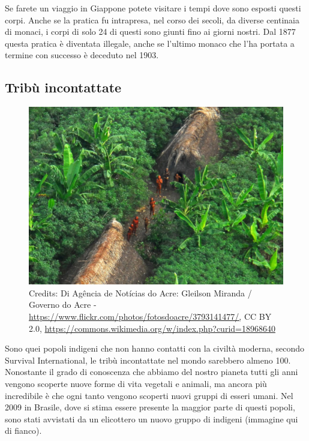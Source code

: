 \documentclass[12pt]{book} %
\begin{document}
Se farete un viaggio in Giappone potete visitare i tempi dove sono esposti questi corpi. Anche se la pratica fu
intrapresa, nel corso dei secoli, da diverse centinaia di monaci, i corpi di solo 24 di questi sono giunti fino ai
giorni nostri. Dal 1877 questa pratica è diventata illegale, anche se l'ultimo monaco che l'ha
portata a termine con successo è deceduto nel 1903.


\bigskip

\subsection{Tribù incontattate}

\begin{figure}
  \centering
  \includegraphics[width=0.95\linewidth]{images/Libro-img043.jpg}
  \begin{minipage}{\linewidth}
    \caption{Credits: Di Agência de Notícias do Acre: Gleilson Miranda / Governo do Acre -
\protect\url{https://www.flickr.com/photos/fotosdoacre/3793141477/,} CC BY 2.0,
\protect\url{https://commons.wikimedia.org/w/index.php?curid=18968640} }
  \end{minipage}
\end{figure}

Sono quei popoli indigeni che non hanno contatti con la civiltà moderna, secondo Survival International, le tribù
incontattate nel mondo sarebbero almeno 100. Nonostante il grado di conoscenza che abbiamo del nostro pianeta tutti gli
anni vengono scoperte nuove forme di vita vegetali e animali, ma ancora più incredibile è che ogni tanto vengono
scoperti nuovi gruppi di esseri umani. Nel 2009 in Brasile, dove si stima essere presente la maggior parte di questi
popoli, sono stati avvistati da un elicottero un nuovo gruppo di indigeni (immagine qui di fianco). 
\end{document}
